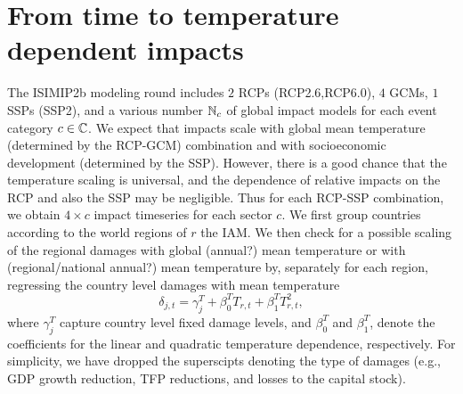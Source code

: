 \documentclass[preprint,3p,authoryear]{elsarticle}
\begin{document}
\section{From time to temperature dependent impacts}
The ISIMIP2b modeling round includes $2$ RCPs (RCP2.6,RCP6.0),  $4$ GCMs, $1$ SSPs (SSP2), and a various number $\mathbb{N}_c$ of global impact models for each event category $c\in\mathbb{C}$.
We expect that impacts scale with global mean temperature (determined by the RCP-GCM) combination and with socioeconomic development (determined by the SSP). However, there is a good chance that the temperature scaling is universal, and the dependence of relative impacts on the RCP and also the SSP may be negligible.  
Thus for each RCP-SSP combination, we obtain $4\times c$ impact timeseries for each sector $c$. We first group countries according to the world regions of $r$ the IAM. We then check for a possible scaling of the regional damages with global (annual?) mean temperature or with (regional/national annual?) mean temperature by, separately for each region, regressing the country level damages with mean temperature 
\begin{equation}
  \label{eq:deltaT}
  \delta_{j,t} = \gamma^T_j + \beta^T_0T_{r,t} + \beta^T_1 T^2_{r,t},
\end{equation}
where $\gamma_j^T$ capture country level fixed damage levels, and $\beta^T_0$ and $\beta^T_1$, denote the coefficients for the linear and quadratic temperature dependence, respectively. For simplicity, we have dropped the superscipts denoting the type of damages (e.g., GDP growth reduction, TFP reductions, and losses to the capital stock).




\end{document}
